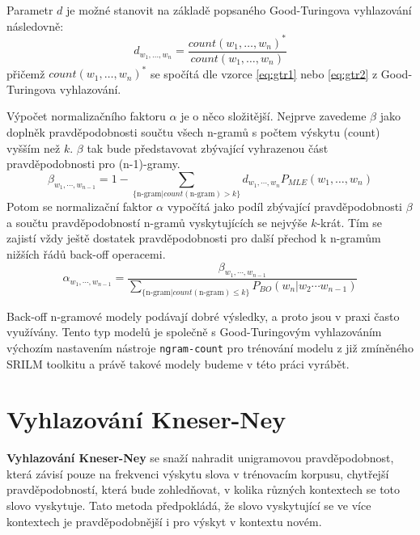 \documentclass[12pt,a4paper]{report}
\begin{document}
Parametr $d$ je možné stanovit na základě popsaného Good-Turingova vyhlazování následovně:
\begin{equation}
d_{w_1, \ldots, w_n} = \frac{count(w_1, \ldots, w_n)^*}{count(w_1, \ldots, w_n)}
\end{equation}
přičemž $count(w_1, \ldots, w_n)^*$ se spočítá dle vzorce \eqref{eq:gtr1} nebo \eqref{eq:gtr2} z Good-Turingova vyhlazování.

Výpočet normalizačního faktoru $\alpha$ je o něco složitější. Nejprve zavedeme $\beta$ jako doplněk pravděpodobnosti součtu všech n-gramů s počtem výskytu (count) vyšším než $k$. $\beta$ tak bude představovat zbývající vyhrazenou část pravděpodobnosti pro (n-1)-gramy.
\begin{equation}
\beta_{w_{1}, \cdots, w_{n-1}} = 1 - \sum_{ \{\text{n-gram} | count(\text{n-gram}) > k \} } d_{w_{1}, \cdots, w_{n}} P_{MLE}(w_1, \ldots, w_n)
\end{equation}
Potom se normalizační faktor $\alpha$ vypočítá jako podíl zbývající pravděpodobnosti $\beta$ a součtu pravděpodobností n-gramů vyskytujících se nejvýše $k$-krát. Tím se zajistí vždy ještě dostatek pravděpodobnosti pro další přechod k n-gramům nižších řádů back-off operacemi.
\begin{equation}
\alpha_{w_{1}, \cdots, w_{n -1}} = \frac{\beta_{w_{1}, \cdots, w_{n -1}}}        {\sum_{ \{ \text{n-gram} | count(\text{n-gram}) \leq k \} } P_{BO}(w_n | w_{2} \cdots w_{n-1})}
\end{equation}

Back-off n-gramové modely podávají dobré výsledky, a proto jsou v praxi často využívány. Tento typ modelů je společně s Good-Turingovým vyhlazováním výchozím nastavením nástroje \texttt{ngram-count} pro trénování modelu z již zmíněného SRILM toolkitu a právě takové modely budeme v této práci vyrábět.

\section{Vyhlazování Kneser-Ney}
\textbf{Vyhlazování Kneser-Ney} se snaží nahradit unigramovou pravděpodobnost, která závisí pouze na frekvenci výskytu slova v trénovacím korpusu, chytřejší pravděpodobností, která bude zohledňovat, v kolika různých kontextech se toto slovo vyskytuje. Tato metoda předpokládá, že slovo vyskytující se ve více kontextech je pravděpodobnější i pro výskyt v kontextu novém.
\end{document}
